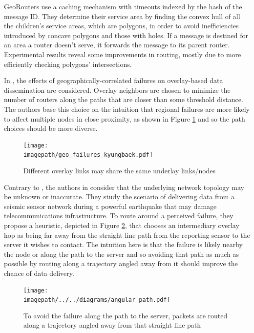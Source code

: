 \documentclass[conference]{IEEEtran}
\newcommand{\imagepath}{../../images/external/location_routing}
\begin{document}
GeoRouters use a caching mechanism with timeouts indexed by the hash of the message ID.
They determine their service area by finding the convex hull of all the children's service areas, which are polygons, in order to avoid inefficiencies introduced by concave polygons and those with holes.
If a message is destined for an area a router doesn't serve, it forwards the message to its parent router.
Experimental results reveal some improvements in routing, mostly due to more efficiently checking polygons' intersections.

In \cite{Kim2010}, the effects of geographically-correlated failures on overlay-based data dissemination are considered.
Overlay neighbors are chosen to minimize the number of routers along the paths that are closer than some threshold distance.
The authors base this choice on the intuition that regional failures are more likely to affect multiple nodes in close proximity, as shown in Figure \ref{fig:geo-failure} and so the path choices should be more diverse.

\begin{figure}
\label{fig:geo-failure}
\centering
\texttt{[image: \\imagepath/geo\_failures\_kyungbaek.pdf]}
\caption{Different overlay links may share the same underlay links/nodes}
\end{figure}

Contrary to \cite{Kim2010}, the authors in \cite{Benson2013} consider that the underlying network topology may be unknown or inaccurate.
They study the scenario of delivering data from a seismic sensor network during a powerful earthquake that may damage telecommunications infrastructure.
To route around a perceived failure, they propose a heuristic, depicted in Figure \ref{fig:orthogonal-path}, that chooses an intermediary overlay hop as being far away from the straight line path from the reporting sensor to the server it wishes to contact.
The intuition here is that the failure is likely nearby the node or along the path to the server and so avoiding that path as much as possible by routing along a trajectory angled away from it should improve the chance of data delivery.

\begin{figure}
\label{fig:orthogonal-path}
\centering
\texttt{[image: \\imagepath/../../diagrams/angular\_path.pdf]}
\caption{To avoid the failure along the path to the server, packets are routed along a trajectory angled away from that straight line path}
\end{figure}
\end{document}
